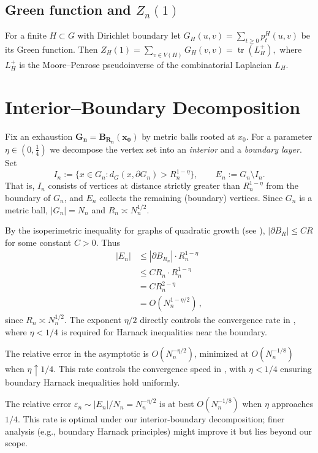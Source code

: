 \documentclass[11pt]{amsart}
\theoremstyle{remark}
\begin{document}
\subsection{Green function and $Z_n(1)$}
For a finite $H\subset G$ with Dirichlet boundary let
$G_H(u,v)=\sum_{t\ge0}p_t^{H}(u,v)$ be its Green function.
Then
\(
  Z_H(1)=\sum_{v\in V(H)}G_H(v,v)=\operatorname{tr}(L_H^{+}),
\)
where $L_H^{+}$ is the Moore--Penrose pseudoinverse of the
combinatorial Laplacian $L_H$.

\section{Interior--Boundary Decomposition}

Fix an exhaustion $\mathbf{G_n = B_{R_n}(x_0)}$ by metric balls rooted at $x_0$.  For a parameter $\eta\in(0,\tfrac14)$ we decompose the vertex set into an 
\emph{interior} and a \emph{boundary layer}.  Set 
\[
  I_n := \{x\in G_n : d_G(x,\partial G_n) > R_n^{1-\eta}\},
  \qquad
  E_n := G_n \setminus I_n.
\]
That is, $I_n$ consists of vertices at distance strictly greater than $R_n^{1-\eta}$ from the boundary of $G_n$, and $E_n$ collects the remaining (boundary) vertices.  Since $G_n$ is a metric ball, $|G_n|=N_n$ and $R_n\asymp N_n^{1/2}$.

By the isoperimetric inequality for graphs of quadratic growth (see \cite[Lemma 2.3]{Delmotte99}), 
$|\partial B_R| \le C R$ for some constant $C>0$. Thus
\begin{align*}
|E_n| &\le |\partial B_{R_n}| \cdot R_n^{1-\eta} \\
        &\le C R_n \cdot R_n^{1-\eta} \\
        &= C R_n^{2-\eta} \\
        &= O(N_n^{1-\eta/2})\,,
\end{align*}
since $R_n \asymp N_n^{1/2}$. The exponent $\eta/2$ directly controls the convergence rate in ,
where $\eta<1/4$ is required for Harnack inequalities near the boundary. 
 
The relative error in the asymptotic is $O(N_n^{-\eta/2})$, minimized at $O(N_n^{-1/8})$ 
when $\eta \uparrow 1/4$. This rate controls the convergence speed in , 
with $\eta < 1/4$ ensuring boundary Harnack inequalities hold uniformly.

The relative error $\varepsilon_n \sim |E_n|/N_n = N_n^{-\eta/2}$ 
is at best $O(N_n^{-1/8})$ 
when $\eta$ approaches $1/4$. This rate is optimal under our interior-boundary decomposition; 
finer analysis (e.g., boundary Harnack principles) might improve it but lies beyond our scope.
\end{document}
